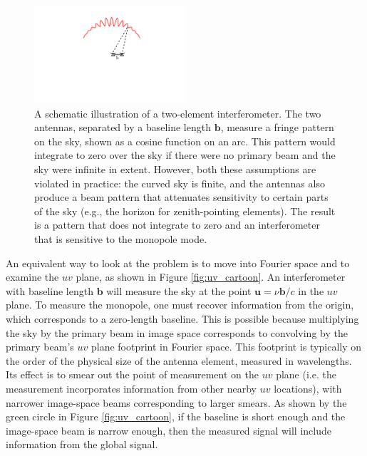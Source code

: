 \documentclass[twocolumn,apj,numberedappendix]{emulateapj}
\def\b{\mathbf{b}}
\begin{document}
\begin{figure}[h]
	\centering
	\includegraphics[width=0.50\textwidth]{figures/beam_pattern_cartoon.pdf}
	\caption{A schematic illustration of a two-element interferometer. The two antennas, separated by a baseline length $\b$, measure a fringe pattern on the sky, shown as a cosine function on an arc. This pattern would integrate to zero over the sky if there were no primary beam and the sky were infinite in extent. However, both these assumptions are violated in practice: the curved sky is finite, and the antennas also produce a beam pattern that attenuates sensitivity to certain parts of the sky (e.g., the horizon for zenith-pointing elements). The result is a pattern that does not integrate to zero and an interferometer that is sensitive to the monopole mode.}
	\label{fig:beam_pattern_cartoon}
\end{figure}

An equivalent way to look at the problem is to move into Fourier space and to examine the $uv$ plane, as shown in Figure \ref{fig:uv_cartoon}. An interferometer with baseline length $\b$ will measure the sky at the point $\mathbf{u} = \nu\b/c$ in the $uv$ plane. To measure the monopole, one must recover information from the origin, which corresponds to a zero-length baseline. This is possible because multiplying the sky by the primary beam in image space corresponds to convolving by the primary beam's $uv$ plane footprint in Fourier space. This footprint is typically on the order of the physical size of the antenna element, measured in wavelengths. Its effect is to smear out the point of measurement on the $uv$ plane (i.e. the measurement incorporates information from other nearby $uv$ locations), with narrower image-space beams corresponding to larger smears. As shown by the green circle in Figure \ref{fig:uv_cartoon}, if the baseline is short enough and the image-space beam is narrow enough, then the measured signal will include information from the global signal.
\end{document}
